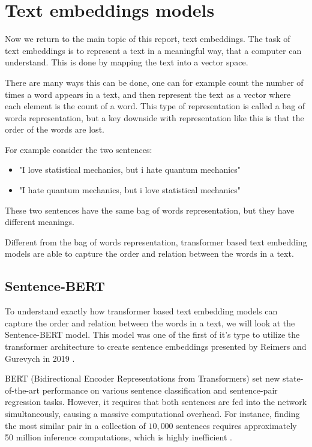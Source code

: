 \section{Text embeddings models}
Now we return to the main topic of this report, text embeddings.
The task of text embeddings is to represent a text in a meaningful way, that a computer can understand. 
This is done by mapping the text into a vector space. 

There are many ways this can be done, one can for example count the number of times a word appears in a text,
and then represent the text as a vector where each element is the count of a word.
This type of representation is called a bag of words representation, but a key 
downside with representation like this is that the order of the words are lost.

For example consider the two sentences:
\begin{itemize}
    \item "I love statistical mechanics, but i hate quantum mechanics"
    \item "I hate quantum mechanics, but i love statistical mechanics"
\end{itemize}
These two sentences have the same bag of words representation, but they have different meanings.

Different from the bag of words representation, 
transformer based text embedding models are able to capture the order and relation between the words in a text.



\subsection{Sentence-BERT}
To understand exactly how transformer based text embedding models can capture the 
order and relation between the words in a text, we will look at the Sentence-BERT model.
This model was one of the first of it's type to utilize the transformer architecture to create sentence embeddings presented 
by Reimers and Gurevych in 2019 \cite{reimers2019sentencebert}.

BERT (Bidirectional Encoder Representations from Transformers) set new state-of-the-art 
performance on various sentence classification and sentence-pair regression tasks.
However, it requires that both sentences are fed into the network simultaneously, 
causing a massive computational overhead. 
For instance, finding the most similar pair in a collection of $10,000$ sentences requires approximately 
50 million inference computations, which is highly inefficient \cite{reimers2019sentencebert}.

